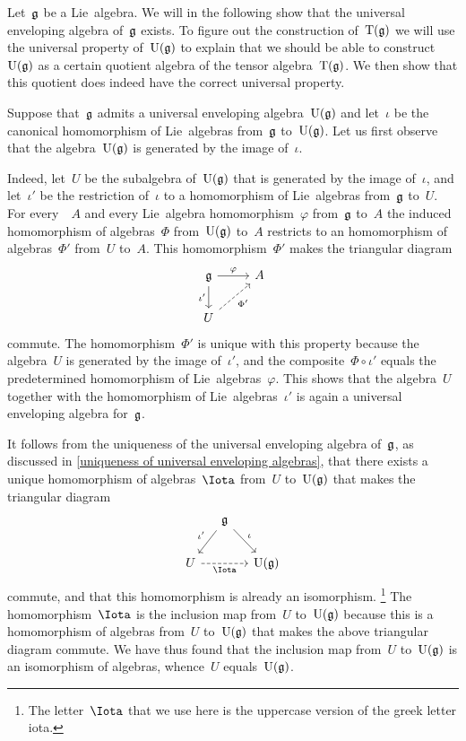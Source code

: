 \begin{fluff}
	Let~$\mathfrak{g}$ be a Lie~algebra.
	We will in the following show that the universal enveloping algebra of~$\mathfrak{g}$ exists.
	To figure out the construction of~$\operatorname{T}(\mathfrak{g})$ we will use the universal property of~$\operatorname{U}(\mathfrak{g})$ to explain that we should be able to construct~$\operatorname{U}(\mathfrak{g})$ as a certain quotient algebra of the tensor algebra~$\operatorname{T}(\mathfrak{g})$.
	We then show that this quotient does indeed have the correct universal property.

	Suppose that~$\mathfrak{g}$ admits a universal enveloping algebra~$\operatorname{U}(\mathfrak{g})$ and let~$\iota$ be the canonical homomorphism of Lie~algebras from~$\mathfrak{g}$ to~$\operatorname{U}(\mathfrak{g})$.
	Let us first observe that the algebra~$\operatorname{U}(\mathfrak{g})$ is generated by the image of~$\iota$.

	Indeed, let~$U$ be the subalgebra of~$\operatorname{U}(\mathfrak{g})$ that is generated by the image of~$\iota$, and let~$\iota'$ be the restriction of~$\iota$ to a homomorphism of Lie~algebras from~$\mathfrak{g}$ to~$U$.
	For every~{\algebra{$\kf$}}~$A$ and every Lie~algebra homomorphism~$\varphi$ from~$\mathfrak{g}$ to~$A$ the induced homomorphism of algebras~$\Phi$ from~$\operatorname{U}(\mathfrak{g})$ to~$A$ restricts to an homomorphism of algebras~$\Phi'$ from~$U$ to~$A$.
	This homomorphism~$\Phi'$ makes the triangular diagram
	\[
		\begin{tikzcd}
			\glie
			\arrow{r}[above]{\varphi}
			\arrow{d}[left]{\iota'}
			&
			A
			\\
			U
			\arrow[dashed]{ur}[below right]{\Phi'}
			&
			{}
		\end{tikzcd}
	\]
	commute.
	The homomorphism~$\Phi'$ is unique with this property because the algebra~$U$ is generated by the image of~$\iota'$, and the composite~$\Phi \circ \iota'$ equals the predetermined homomorphism of Lie~algebras~$\varphi$.
	This shows that the algebra~$U$ together with the homomorphism of Lie~algebras~$\iota'$ is again a universal enveloping algebra for~$\mathfrak{g}$.
	
	It follows from the uniqueness of the universal enveloping algebra of~$\mathfrak{g}$, as discussed in \cref{uniqueness of universal enveloping algebras}, that there exists a unique homomorphism of algebras~$\Iota$ from~$U$ to~$\operatorname{U}(\mathfrak{g})$ that makes the triangular diagram
	\[
		\begin{tikzcd}[column sep = small]
			{}
			&
			\glie
			\arrow{dl}[above left]{\iota'}
			\arrow{dr}[above right]{\iota}
			&
			{}
			\\
			U
			\arrow[dashed]{rr}[below]{\Iota}
			&
			{}
			&
			\Univ(\glie)
		\end{tikzcd}
	\]
	commute, and that this homomorphism is already an isomorphism.%
	\footnote{The letter~$\Iota$ that we use here is the uppercase version of the greek letter iota.}
	The homomorphism~$\Iota$ is the inclusion map from~$U$ to~$\operatorname{U}(\mathfrak{g})$ because this is a homomorphism of algebras from~$U$ to~$\operatorname{U}(\mathfrak{g})$ that makes the above triangular diagram commute.
	We have thus found that the inclusion map from~$U$ to~$\operatorname{U}(\mathfrak{g})$ is an isomorphism of algebras, whence~$U$ equals~$\operatorname{U}(\mathfrak{g})$.


\end{fluff}
